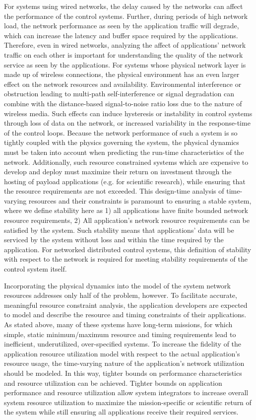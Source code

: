 For systems using wired networks, the delay caused by the networks can
affect the performance of the control systems.  Further, during
periods of high network load, the network performance as seen by the
application traffic will degrade, which can increase the latency and
buffer space required by the applications.  Therefore, even in wired
networks, analyzing the affect of applications' network traffic on
each other is important for understanding the quality of the network
service as seen by the applications.  For systems whose physical
network layer is made up of wireless connections, the physical
environment has an even larger effect on the network resources and
availability.  Environmental interference or obstruction leading to
multi-path self-interference or signal degradation can combine with
the distance-based signal-to-noise ratio loss due to the nature of
wireless media.  Such effects can induce hysteresis or instability in
control systems through loss of data on the network, or increased
variability in the response-time of the control loops.  Because the
network performance of such a system is so tightly coupled with the
physics governing the system, the physical dynamics must be taken into
account when predicting the run-time characteristics of the network.
Additionally, such resource constrained systems which are expensive to
develop and deploy must maximize their return on investment through
the hosting of payload applications (e.g. for scientific research),
while ensuring that the resource requirements are not exceeded.  This
design-time analysis of time-varying resources and their constraints
is paramount to ensuring a stable system, where we define stability
here as 1) all applications have finite bounded network resource
requirements, 2) All application's network resource requirements can
be satisfied by the system.  Such stability means that applications'
data will be serviced by the system without loss and within the time
required by the application.  For networked distributed control
systems, this definition of stability with respect to the network is
required for meeting stability requirements of the control system
itself.  

Incorporating the physical dynamics into the model of the system
network resources addresses only half of the problem, however.  To
facilitate accurate, meaningful resource constraint analysis, the
application developers are expected to model and describe the resource
and timing constraints of their applications.  As stated above, many
of these systems have long-term missions, for which simple, static
minimum/maximum resource and timing requirements lead to inefficient,
underutilized, over-specified systems.  To increase the fidelity of
the application resource utilization model with respect to the actual
application's resource usage, the time-varying nature of the
application's network utilization should be modeled.  In this way,
tighter bounds on performance characteristics and resource utilization
can be achieved.  Tighter bounds on application performance and
resource utilization allow system integrators to increase overall
system resource utilization to maximize the mission-specific or
scientific return of the system while still ensuring all applications
receive their required services.

